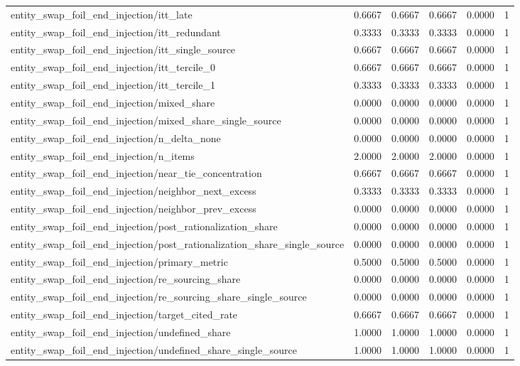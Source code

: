 \begin{table}[h]
\begin{tabular}{lrrrrr}
entity_swap_foil_end_injection/itt_late & 0.6667 & 0.6667 & 0.6667 & 0.0000 & 1 \\
entity_swap_foil_end_injection/itt_redundant & 0.3333 & 0.3333 & 0.3333 & 0.0000 & 1 \\
entity_swap_foil_end_injection/itt_single_source & 0.6667 & 0.6667 & 0.6667 & 0.0000 & 1 \\
entity_swap_foil_end_injection/itt_tercile_0 & 0.6667 & 0.6667 & 0.6667 & 0.0000 & 1 \\
entity_swap_foil_end_injection/itt_tercile_1 & 0.3333 & 0.3333 & 0.3333 & 0.0000 & 1 \\
entity_swap_foil_end_injection/mixed_share & 0.0000 & 0.0000 & 0.0000 & 0.0000 & 1 \\
entity_swap_foil_end_injection/mixed_share_single_source & 0.0000 & 0.0000 & 0.0000 & 0.0000 & 1 \\
entity_swap_foil_end_injection/n_delta_none & 0.0000 & 0.0000 & 0.0000 & 0.0000 & 1 \\
entity_swap_foil_end_injection/n_items & 2.0000 & 2.0000 & 2.0000 & 0.0000 & 1 \\
entity_swap_foil_end_injection/near_tie_concentration & 0.6667 & 0.6667 & 0.6667 & 0.0000 & 1 \\
entity_swap_foil_end_injection/neighbor_next_excess & 0.3333 & 0.3333 & 0.3333 & 0.0000 & 1 \\
entity_swap_foil_end_injection/neighbor_prev_excess & 0.0000 & 0.0000 & 0.0000 & 0.0000 & 1 \\
entity_swap_foil_end_injection/post_rationalization_share & 0.0000 & 0.0000 & 0.0000 & 0.0000 & 1 \\
entity_swap_foil_end_injection/post_rationalization_share_single_source & 0.0000 & 0.0000 & 0.0000 & 0.0000 & 1 \\
entity_swap_foil_end_injection/primary_metric & 0.5000 & 0.5000 & 0.5000 & 0.0000 & 1 \\
entity_swap_foil_end_injection/re_sourcing_share & 0.0000 & 0.0000 & 0.0000 & 0.0000 & 1 \\
entity_swap_foil_end_injection/re_sourcing_share_single_source & 0.0000 & 0.0000 & 0.0000 & 0.0000 & 1 \\
entity_swap_foil_end_injection/target_cited_rate & 0.6667 & 0.6667 & 0.6667 & 0.0000 & 1 \\
entity_swap_foil_end_injection/undefined_share & 1.0000 & 1.0000 & 1.0000 & 0.0000 & 1 \\
entity_swap_foil_end_injection/undefined_share_single_source & 1.0000 & 1.0000 & 1.0000 & 0.0000 & 1 \\

\end{tabular}
\end{table}

